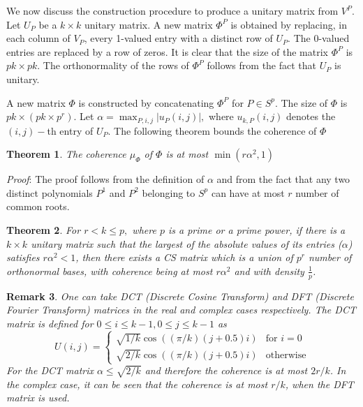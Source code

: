 \documentclass{IEEEtran}
\newtheorem{theorem}{Theorem}[section]
\newtheorem{remark}[theorem]{Remark}
\begin{document}
We now discuss the construction procedure to produce a unitary matrix
from $V^{P}$. Let $U_{P}$ be a $k\times k$ unitary matrix. A new matrix
$\Phi^P$ is obtained by replacing, in each column of  $V_P$, every 1-valued
entry with a distinct row of $U_P$. The $0$-valued entries are
replaced by a row of zeros. It is clear that the size of the matrix
$\Phi^P$ is $pk \times pk$. The orthonormality of the rows of $\Phi^P$
follows from the fact that $U_P$ is unitary.

A new matrix $\Phi$ is constructed by concatenating $\Phi^P$
for $P\in S^{p}$. The size of $\Phi$ is $pk \times (pk\times p^{r})$.
Let $\alpha =\max_{P,i,j} |u_{P}(i,j)|,$ where $u_{k,P}(i,j)$ denotes the
$(i,j)-$th entry of $U_{P}$. The following theorem bounds the coherence of
$\Phi$
\begin{theorem}
  The coherence $\mu_{\Phi}$ of $\Phi$ is at most $\min(r\alpha^{2},1)$
\end{theorem}
\textit{Proof}: The proof follows from the definition of $\alpha$ and from
the fact that any two distinct polynomials $P^{1}$ and $P^{2}$ belonging to
$S^{p}$ can have at most $r$ number of common roots.

\begin{theorem}
  For $r<k\leq p,$ where $p$ is a prime or a prime power, if there is a $k\times k$
  unitary matrix such that the largest of the absolute values of its entries ($\alpha$)
  satisfies $r\alpha^{2}<1$, then there exists a CS matrix which is
  a union of $p^{r}$ number of orthonormal bases, with coherence being at most
  $r\alpha^{2}$ and with density $\frac{1}{p}$.  
\end{theorem}

\begin{remark}
  One can take DCT (Discrete Cosine Transform) and DFT (Discrete Fourier
  Transform) matrices in the real and complex cases respectively. The DCT matrix
  is defined for $0 \leq i \leq k-1, 0 \leq j \leq k-1$ as
  $$
  U(i,j) =
  \begin{cases}
    \sqrt{1/k}\cos((\pi/k)(j + 0.5)i) & \text{for~} i = 0 \\
    \sqrt{2/k}\cos((\pi/k)(j + 0.5)i) & \text{otherwise}
  \end{cases}
  $$
  For the DCT matrix $\alpha \leq \sqrt{2/k}$ and therefore the coherence
  is at most $2r/k$. In the complex case, it can be seen that
  the coherence is at most $r/k$, when the DFT matrix is used.

\end{remark}
\end{document}
